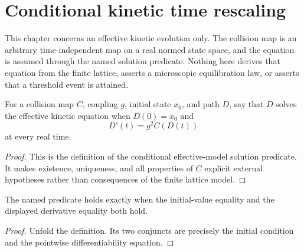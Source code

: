 
\chapter{Conditional kinetic time rescaling}
\label{ch:ArchonPhysics_KineticRescaling}

This chapter concerns an effective kinetic evolution only.  The collision map
is an arbitrary time-independent map on a real normed state space, and the
equation is assumed through the named solution predicate.  Nothing here derives
that equation from the finite lattice, asserts a microscopic equilibration law,
or asserts that a threshold event is attained.

\begin{definition}
\label{def:kinetic:solves}
For a collision map $C$, coupling $g$, initial state $x_0$, and path $D$, say
that $D$ solves the effective kinetic equation when $D(0)=x_0$ and
\[
  D'(t)=g^2 C(D(t))
\]
at every real time.
\end{definition}
\begin{proof}


\leanok
This is the definition of the conditional effective-model solution predicate.
It makes existence, uniqueness, and all properties of $C$ explicit external
hypotheses rather than consequences of the finite lattice model.
\end{proof}

\begin{theorem}
\label{thm:kinetic:solution-iff}
The named predicate holds exactly when the initial-value equality and the
displayed derivative equality both hold.
\end{theorem}
\begin{proof}


\leanok
Unfold the definition.  Its two conjuncts are precisely the initial condition
and the pointwise differentiability equation.
\end{proof}

